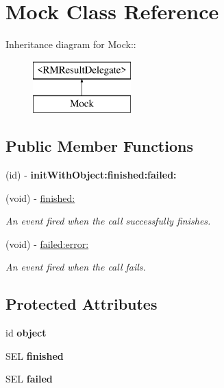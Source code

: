 \hypertarget{interface_mock}{
\section{Mock Class Reference}
\label{interface_mock}
}
Inheritance diagram for Mock::\begin{figure}[H]
\begin{center}
\leavevmode
\includegraphics[height=2cm]{interface_mock}
\end{center}
\end{figure}
\subsection*{Public Member Functions}
\begin{DoxyCompactItemize}
\item 
\hypertarget{interface_mock_a24935b458f7a6a2aa01b28e9c5f81b63}{
(id) -\/ {\bfseries initWithObject:finished:failed:}}
\label{interface_mock_a24935b458f7a6a2aa01b28e9c5f81b63}

\item 
(void) -\/ \hyperlink{interface_mock_ab15e59579bf7b5c5de900d28374062b7}{finished:}
\begin{DoxyCompactList}\small\item\em An event fired when the call successfully finishes. \item\end{DoxyCompactList}\item 
(void) -\/ \hyperlink{interface_mock_ae57e780c8ddcf5c4c79af12c54d58cff}{failed:error:}
\begin{DoxyCompactList}\small\item\em An event fired when the call fails. \item\end{DoxyCompactList}\end{DoxyCompactItemize}
\subsection*{Protected Attributes}
\begin{DoxyCompactItemize}
\item 
\hypertarget{interface_mock_acd44dbbfc0cf1442f66471cdab70f642}{
id {\bfseries object}}
\label{interface_mock_acd44dbbfc0cf1442f66471cdab70f642}

\item 
\hypertarget{interface_mock_a28044b61b39281421caafdb81ef258cf}{
SEL {\bfseries finished}}
\label{interface_mock_a28044b61b39281421caafdb81ef258cf}

\item 
\hypertarget{interface_mock_a25af3f8adbc951c4ea3b6b4a1e5687d3}{
SEL {\bfseries failed}}
\label{interface_mock_a25af3f8adbc951c4ea3b6b4a1e5687d3}

\end{DoxyCompactItemize}


